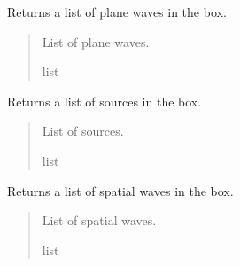 \documentclass[letterpaper,10pt,english]{sphinxmanual}
\begin{document}
\begin{fulllineitems}
\begin{fulllineitems}
\label{\detokenize{source/Box:Box.Box.get_plane_waves}}
\pysigstartsignatures
\pysiglinewithargsret
{}
{}
{}
\pysigstopsignatures
\sphinxAtStartPar
Returns a list of plane waves in the box.
\begin{quote}\begin{description}
\sphinxAtStartPar
List of plane waves.

\sphinxAtStartPar
list

\end{description}\end{quote}

\end{fulllineitems}


\begin{fulllineitems}
\label{\detokenize{source/Box:Box.Box.get_sources}}
\pysigstartsignatures
\pysiglinewithargsret
{}
{}
{}
\pysigstopsignatures
\sphinxAtStartPar
Returns a list of sources in the box.
\begin{quote}\begin{description}
\sphinxAtStartPar
List of sources.

\sphinxAtStartPar
list

\end{description}\end{quote}

\end{fulllineitems}


\begin{fulllineitems}
\label{\detokenize{source/Box:Box.Box.get_spatial_waves}}
\pysigstartsignatures
\pysiglinewithargsret
{}
{}
{}
\pysigstopsignatures
\sphinxAtStartPar
Returns a list of spatial waves in the box.
\begin{quote}\begin{description}
\sphinxAtStartPar
List of spatial waves.

\sphinxAtStartPar
list


\end{description}
\end{quote}
\end{fulllineitems}
\end{fulllineitems}
\end{document}
